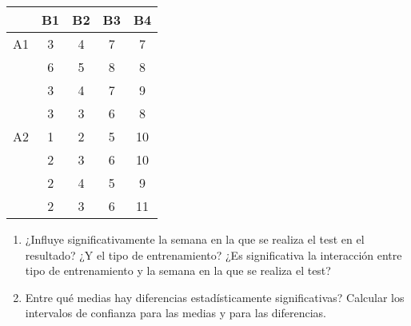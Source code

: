 \begin{enumerate}
\begin{center}
\begin{tabular}{|l|l|l|l|l|}
\cline{2-5}
\multicolumn{1}{c|}{} & \multicolumn{1}{c|}{B1} & \multicolumn{1}{c|}{B2} & \multicolumn{1}{c|}{B3} & \multicolumn{1}{c|}{B4} \\
\hline
\multicolumn{1}{|c|}{A1} & \multicolumn{1}{c|}{3} & \multicolumn{1}{c|}{4} & \multicolumn{1}{c|}{7} & \multicolumn{1}{c|}{7} \\
\cline{2-5}
\multicolumn{1}{|c|}{} & \multicolumn{1}{c|}{6} & \multicolumn{1}{c|}{5} & \multicolumn{1}{c|}{8} & \multicolumn{1}{c|}{8} \\
\cline{2-5}
\multicolumn{1}{|c|}{} & \multicolumn{1}{c|}{3} & \multicolumn{1}{c|}{4} & \multicolumn{1}{c|}{7} & \multicolumn{1}{c|}{9} \\
\cline{2-5}
\multicolumn{1}{|c|}{} & \multicolumn{1}{c|}{3} & \multicolumn{1}{c|}{3} & \multicolumn{1}{c|}{6} & \multicolumn{1}{c|}{8} \\
\hline
\multicolumn{1}{|c|}{A2} & \multicolumn{1}{c|}{1} & \multicolumn{1}{c|}{2} & \multicolumn{1}{c|}{5} & \multicolumn{1}{c|}{10} \\
\cline{2-5}
\multicolumn{1}{|c|}{} & \multicolumn{1}{c|}{2} & \multicolumn{1}{c|}{3} & \multicolumn{1}{c|}{6} & \multicolumn{1}{c|}{10} \\
\cline{2-5}
\multicolumn{1}{|c|}{} & \multicolumn{1}{c|}{2} & \multicolumn{1}{c|}{4} & \multicolumn{1}{c|}{5} & \multicolumn{1}{c|}{9} \\
\cline{2-5}
\multicolumn{1}{|c|}{} & \multicolumn{1}{c|}{2} & \multicolumn{1}{c|}{3} & \multicolumn{1}{c|}{6} & \multicolumn{1}{c|}{11} \\
\hline
\end{tabular}

\end{center}

\begin{enumerate}

\item ¿Influye significativamente la semana en la que se realiza el test en el resultado? ¿Y el tipo de entrenamiento? ¿Es significativa la interacción entre tipo de entrenamiento y la semana en la que se realiza el test?

\item Entre qué medias hay diferencias estadísticamente significativas? Calcular los intervalos de confianza para las medias y para las diferencias.

\end{enumerate}


\end{enumerate}

